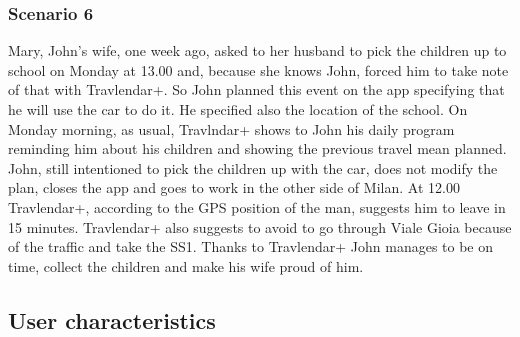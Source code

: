 	\subsubsection{Scenario 6}
		Mary, John's wife, one week ago, asked to her husband to pick the children up to school on Monday at 13.00 and, because she knows John,  forced him to take note of that with Travlendar+.\newline
		So John planned this event on the app specifying that he will use the car to do it.
		He specified also the location of the school.\newline
		On Monday morning, as usual, Travlndar+ shows to John his daily program reminding him about his children and showing the previous  travel mean planned.\newline
		John, still intentioned to pick the children up with the car, does not modify the plan, closes the app and goes to work in the other side of Milan.\newline
		At 12.00 Travlendar+, according to the GPS position of the man, suggests him to leave in 15 minutes.
		Travlendar+ also suggests to avoid to go through  Viale Gioia because of the traffic and take the SS1.\newline
		Thanks to Travlendar+ John manages to be on time, collect the children and make his wife proud of him. 
\subsection{User characteristics}
